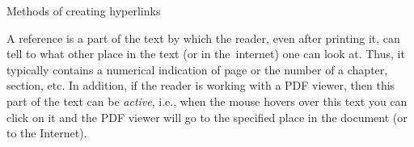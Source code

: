 %



\sec[links] Methods of creating hyperlinks

A reference is a part of the text by which the reader, even after printing it, can tell to what other place in the text (or in the~internet) one can look at. Thus, it typically contains a numerical indication of page or the number of a chapter, section, etc. In addition, if the reader is working with a PDF viewer, then this part of the text can be {\em active}, i.e., when the mouse hovers over
this text you can click on it and the PDF viewer will go to the specified place in the document (or to the Internet).

